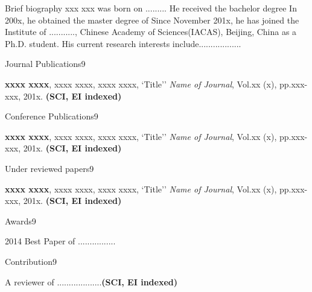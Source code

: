 \begin{resume}

\begin{resumesection}{Brief biography}
xxx xxx was born on .........
He received the bachelor degree
In 200x, he obtained the master degree of
Since November 201x, he has joined the Institute of ..........., Chinese Academy of Sciences(IACAS), Beijing, China as a Ph.D. student.
His current research interests include..................

\end{resumesection}

\begin{publicationlist}{Journal Publications}{9}
    \item \textbf{xxxx xxxx}, xxxx xxxx, xxxx xxxx,
        `Title''
        \emph{Name of Journal}, Vol.xx (x), pp.xxx-xxx, 201x. \textbf{(SCI, EI indexed)}

\end{publicationlist}

\newpage
\begin{publicationlist}{Conference Publications}{9}
    \item \textbf{xxxx xxxx}, xxxx xxxx, xxxx xxxx,
        `Title''
        \emph{Name of Journal}, Vol.xx (x), pp.xxx-xxx, 201x. \textbf{(SCI, EI indexed)}
\end{publicationlist}

\begin{publicationlist}{Under reviewed papers}{9}
   \item \textbf{xxxx xxxx}, xxxx xxxx, xxxx xxxx,
        `Title''
        \emph{Name of Journal}, Vol.xx (x), pp.xxx-xxx, 201x. \textbf{(SCI, EI indexed)}
\end{publicationlist}

\begin{publicationlist}{Awards}{9}
    \item 2014 Best Paper of ................

\end{publicationlist}

\begin{publicationlist}{Contribution}{9}
    \item A reviewer of ...................\textbf{(SCI, EI indexed)}

\end{publicationlist}

\end{resume}
